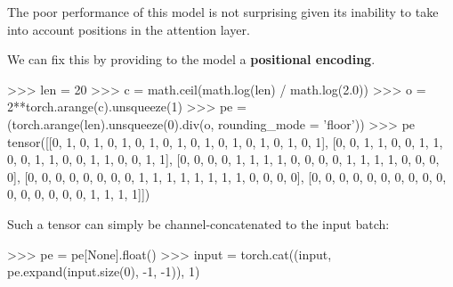 \documentclass[c,8pt]{beamer}
\begin{document}

\begin{frame}[fragile]

The poor performance of this model is not surprising given its
inability to take into account positions in the attention layer.

We can fix this by providing to the model a \textbf{positional
  encoding}.

\begin{rawsrc}
>>> len = 20
>>> c = math.ceil(math.log(len) / math.log(2.0))
>>> o = 2**torch.arange(c).unsqueeze(1)
>>> pe = (torch.arange(len).unsqueeze(0).div(o, rounding_mode = 'floor')) %
>>> pe
tensor([[0, 1, 0, 1, 0, 1, 0, 1, 0, 1, 0, 1, 0, 1, 0, 1, 0, 1, 0, 1],
        [0, 0, 1, 1, 0, 0, 1, 1, 0, 0, 1, 1, 0, 0, 1, 1, 0, 0, 1, 1],
        [0, 0, 0, 0, 1, 1, 1, 1, 0, 0, 0, 0, 1, 1, 1, 1, 0, 0, 0, 0],
        [0, 0, 0, 0, 0, 0, 0, 0, 1, 1, 1, 1, 1, 1, 1, 1, 0, 0, 0, 0],
        [0, 0, 0, 0, 0, 0, 0, 0, 0, 0, 0, 0, 0, 0, 0, 0, 1, 1, 1, 1]])
\end{rawsrc}

Such a tensor can simply be channel-concatenated to the input batch:

\begin{rawsrc}
>>> pe = pe[None].float()
>>> input = torch.cat((input, pe.expand(input.size(0), -1, -1)), 1)
\end{rawsrc}


\end{frame}
\end{document}
